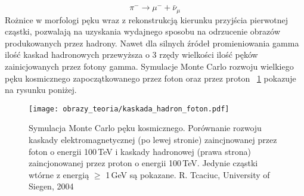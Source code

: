 \documentclass[a4paper,11pt,twoside]{article}
\begin{document}
\begin{equation*}
\pi^- \rightarrow \mu^- + \bar{\nu}_{\mu}
\end{equation*}
Rożnice w morfologi pęku wraz z rekonstrukcją kierunku przyjścia pierwotnej cząstki, pozwalają na uzyskania wydajnego sposobu na odrzucenie obrazów produkowanych przez hadrony. Nawet dla silnych źródeł promieniowania gamma ilość kaskad hadronowych przewyższa o 3 rzędy wielkości ilość pęków zainicjowanych przez fotony gamma. Symulacje Monte Carlo rozwoju wielkiego pęku kosmicznego zapoczątkowanego przez foton oraz przez proton ~\ref{fig:cascade_mc} pokazuje na rysunku poniżej.
\begin{figure}[H] 
\centering
\texttt{[image: obrazy\_teoria/kaskada\_hadron\_foton.pdf]}
\caption{Symulacja Monte Carlo pęku kosmicznego. Porównanie rozwoju kaskady elektromagnetycznej (po lewej stronie) zaincjnowanej przez foton o energii 100\,TeV i kaskady hadronowej (prawa strona) zaincjonowanej przez proton o energii 100\,TeV. Jedynie cząstki wtórne z energią $\geq$ 1\,GeV są pokazane. R. Tcaciuc, University of Siegen, 2004 \cite{astro_particle}}
\label{fig:cascade_mc}
\end{figure}
\end{document}
